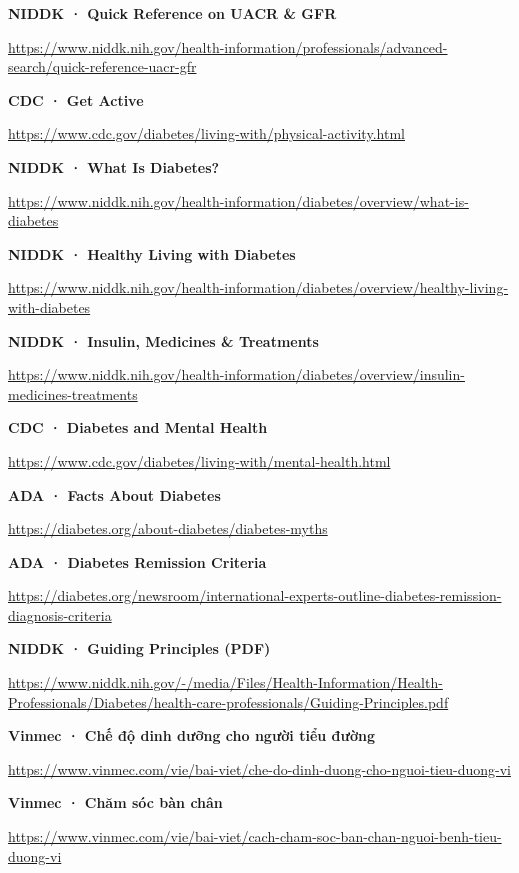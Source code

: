\noindent\textbf{NIDDK · Quick Reference on UACR \& GFR}\par\noindent\url{https://www.niddk.nih.gov/health-information/professionals/advanced-search/quick-reference-uacr-gfr}\par\medskip

\noindent\textbf{CDC · Get Active}\par\noindent\url{https://www.cdc.gov/diabetes/living-with/physical-activity.html}\par\medskip

\noindent\textbf{NIDDK · What Is Diabetes?}\par\noindent\url{https://www.niddk.nih.gov/health-information/diabetes/overview/what-is-diabetes}\par\medskip

\noindent\textbf{NIDDK · Healthy Living with Diabetes}\par\noindent\url{https://www.niddk.nih.gov/health-information/diabetes/overview/healthy-living-with-diabetes}\par\medskip

\noindent\textbf{NIDDK · Insulin, Medicines \& Treatments}\par\noindent\url{https://www.niddk.nih.gov/health-information/diabetes/overview/insulin-medicines-treatments}\par\medskip

\noindent\textbf{CDC · Diabetes and Mental Health}\par\noindent\url{https://www.cdc.gov/diabetes/living-with/mental-health.html}\par\medskip

\noindent\textbf{ADA · Facts About Diabetes}\par\noindent\url{https://diabetes.org/about-diabetes/diabetes-myths}\par\medskip

\noindent\textbf{ADA · Diabetes Remission Criteria}\par\noindent\url{https://diabetes.org/newsroom/international-experts-outline-diabetes-remission-diagnosis-criteria}\par\medskip

\noindent\textbf{NIDDK · Guiding Principles (PDF)}\par\noindent\url{https://www.niddk.nih.gov/-/media/Files/Health-Information/Health-Professionals/Diabetes/health-care-professionals/Guiding-Principles.pdf}\par\medskip

\noindent\textbf{Vinmec · Chế độ dinh dưỡng cho người tiểu đường}\par\noindent\url{https://www.vinmec.com/vie/bai-viet/che-do-dinh-duong-cho-nguoi-tieu-duong-vi}\par\medskip

\noindent\textbf{Vinmec · Chăm sóc bàn chân}\par\noindent\url{https://www.vinmec.com/vie/bai-viet/cach-cham-soc-ban-chan-nguoi-benh-tieu-duong-vi}\par\medskip